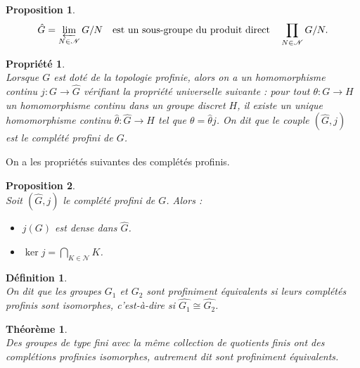 \documentclass[a4paper, 14pt]{report}
\newtheorem{definition}{Définition}[section]
\newtheorem{proposition}{Proposition}[section]
\newtheorem{propriety}{Propriété}[section]
\newtheorem{theorem}{Théorème}[section]
\begin{document}
\begin{onehalfspace}
{\begin{proposition} \cite{herfort2012profinite}\\
	\[
	\hat{G} = \varprojlim_{N \in \mathscr{N}} G/N \quad \text{est un sous-groupe du produit direct} \quad \prod_{N \in \mathscr{N}} G/N.
	\]
\end{proposition}


\begin{propriety}  \cite{herfort2012profinite}\\
Lorsque $G$ est doté de la topologie profinie, alors on a un homomorphisme continu $j : G \to \widehat{G}$ vérifiant la propriété universelle suivante : pour tout $\theta : G \to H$ un homomorphisme continu dans un groupe discret $H$, il existe un unique homomorphisme continu $\widehat{\theta} : \widehat{G} \to H$ tel que $\theta = \widehat{\theta} j$. On dit que le couple $(\widehat{G}, j)$ est le complété profini de $G$.
\end{propriety}
On a les propriétés suivantes des complétés profinis.

\begin{proposition} \cite{ribes-zalesskii}\\
Soit $(\widehat{G}, j)$ le complété profini de $G$. Alors :
	\begin{itemize}
		\item[(a)] $j(G)$ est dense dans $\widehat{G}$.
		\item[(b)] $\ker j = \bigcap_{K \in \mathcal{N}} K$.
	\end{itemize}	
\end{proposition}


\begin{definition} \cite{ribes-zalesskii}\\
On dit que les groupes $G_1$ et $G_2$ sont \textit{profiniment équivalents} si leurs complétés profinis sont isomorphes, c'est-à-dire si $\widehat{G_1} \cong \widehat{G_2}$.
\end{definition}

\begin{theorem} \cite{herfort2012profinite}\\
Des groupes de type fini avec la même collection de quotients finis ont des complétions profinies isomorphes, autrement dit sont profiniment équivalents.
\end{theorem}

}
\end{onehalfspace}
\end{document}
